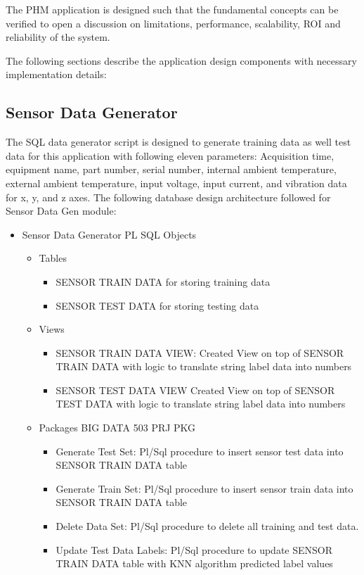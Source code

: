 \documentclass[sigconf]{acmart}
\begin{document}
The PHM application is designed such that the fundamental concepts can be verified to open a discussion on limitations, performance, scalability, ROI and reliability of the system.

The following sections describe the application design components with necessary implementation details:
\subsection{Sensor Data Generator}
The SQL data generator script is designed to generate training data as well test data for this application with following eleven parameters: Acquisition time, equipment name, part number, serial number, internal ambient temperature, external ambient temperature, input voltage, input current, and vibration data for x, y, and z axes. 
The following database design architecture followed for Sensor Data Gen module:
\begin{itemize}
  \item Sensor Data Generator PL SQL Objects
  \begin{itemize}
  \item Tables
\begin{itemize}
\item SENSOR TRAIN DATA for storing training data
\item SENSOR TEST DATA for storing testing data
\end{itemize}
\item Views
\begin{itemize}
\item SENSOR TRAIN DATA VIEW:
      Created View on top of SENSOR TRAIN DATA with logic to translate string label data into numbers
\item SENSOR TEST DATA VIEW
      Created View on top of SENSOR TEST DATA with logic to translate string label data into numbers
\end{itemize}
\item Packages BIG DATA 503 PRJ PKG
\begin{itemize}
\item Generate Test Set:
      Pl/Sql procedure to insert sensor test data into SENSOR TRAIN DATA table
\item Generate Train Set:
      Pl/Sql procedure to insert sensor train data into SENSOR TRAIN DATA table
\item Delete Data Set:
      Pl/Sql procedure to delete all training and test data.
\item Update Test Data Labels:
      Pl/Sql procedure to update SENSOR TRAIN DATA table with KNN algorithm predicted label values
\end{itemize}
\end{itemize}
\end{itemize}
\end{document}
